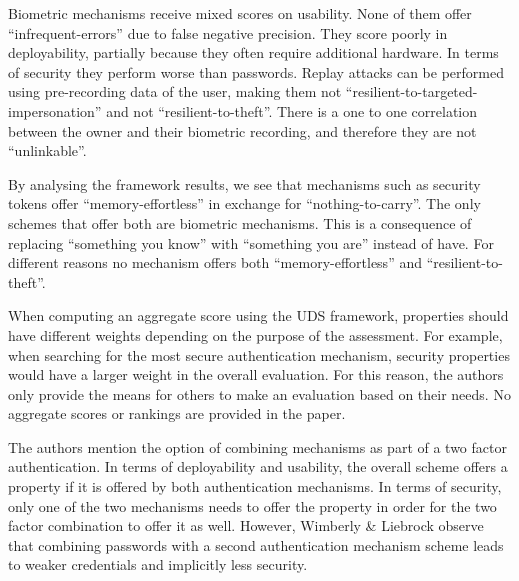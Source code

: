 Biometric mechanisms receive mixed scores on usability. None of them offer ``infrequent-errors'' due to false negative precision. They score poorly in deployability, partially because they often require additional hardware. In terms of security they perform worse than passwords. Replay attacks can be performed using pre-recording data of the user, making them not ``resilient-to-targeted-impersonation'' and not ``resilient-to-theft''. There is a one to one correlation between the owner and their biometric recording, and therefore they are not ``unlinkable''.

By analysing the framework results, we see that mechanisms such as security tokens offer ``memory-effortless'' in exchange for ``nothing-to-carry''.  The only schemes that offer both are biometric mechanisms. This is a consequence of replacing ``something you know'' with ``something you are'' instead of have. For different reasons no mechanism offers both ``memory-effortless'' and ``resilient-to-theft''.

When computing an aggregate score using the UDS framework, properties should have different weights depending on the purpose of the assessment. For example, when searching for the most secure authentication mechanism, security properties would have a larger weight in the overall evaluation. For this reason, the authors only provide the means for others to make an evaluation based on their needs. No aggregate scores or rankings are provided in the paper. 

The authors mention the option of combining mechanisms as part of a two factor authentication. In terms of deployability and usability, the overall scheme offers a property if it is offered by both authentication mechanisms. In terms of security, only one of the two mechanisms needs to offer the property in order for the two factor combination to offer it as well. However, Wimberly \& Liebrock \cite{wimberly2011using} observe that combining passwords with a second authentication mechanism scheme leads to weaker credentials and implicitly less security.


